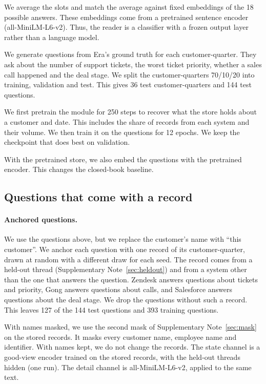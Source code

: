 \documentclass[11pt]{article}
\begin{document}
We average the slots and match the average against fixed embeddings of the 18 possible answers. These embeddings come from a pretrained sentence encoder (all-MiniLM-L6-v2). Thus, the reader is a classifier with a frozen output layer rather than a language model.

We generate questions from Era's ground truth for each customer-quarter. They ask about the number of support tickets, the worst ticket priority, whether a sales call happened and the deal stage. We split the customer-quarters 70/10/20 into training, validation and test. This gives 36 test customer-quarters and 144 test questions.

We first pretrain the module for 250 steps to recover what the store holds about a customer and date. This includes the share of records from each system and their volume. We then train it on the questions for 12 epochs. We keep the checkpoint that does best on validation.

With the pretrained store, we also embed the questions with the pretrained encoder. This changes the closed-book baseline.

\subsection{Questions that come with a record}
\paragraph{Anchored questions.} We use the questions above, but we replace the customer's name with ``this customer''. We anchor each question with one record of its customer-quarter, drawn at random with a different draw for each seed. The record comes from a held-out thread (Supplementary Note~\ref{sec:heldout}) and from a system other than the one that answers the question. Zendesk answers questions about tickets and priority, Gong answers questions about calls, and Salesforce answers questions about the deal stage. We drop the questions without such a record. This leaves 127 of the 144 test questions and 393 training questions.

With names masked, we use the second mask of Supplementary Note~\ref{sec:mask} on the stored records. It masks every customer name, employee name and identifier. With names kept, we do not change the records. The state channel is a good-view encoder trained on the stored records, with the held-out threads hidden (one run). The detail channel is all-MiniLM-L6-v2, applied to the same text.
\end{document}
